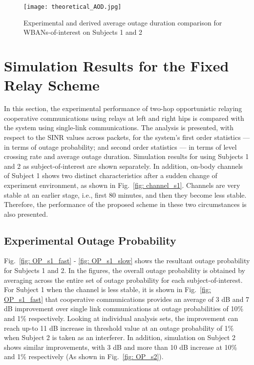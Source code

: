 \documentclass[12pt,draftcls,a4paper,onecolumn,journal]{IEEEtran}
\begin{document}
\begin{figure}[]
\centering
\texttt{[image: theoretical\_AOD.jpg]}
\caption{Experimental and derived average outage duration comparison for WBANs-of-interest on Subjects 1 and 2}
\label{fig:Theoretical AOD}
\end{figure}



\section{Simulation Results for the Fixed Relay Scheme}
In this section, the experimental performance of two-hop opportunistic relaying cooperative communications using relays at left and right hips is compared with the system using single-link communications. The analysis is presented, with respect to the SINR values across packets, for the system's first order statistics --- in terms of outage probability; and second order statistics --- in terms of level crossing rate and average outage duration. Simulation results for using Subjects 1 and 2 as subject-of-interest are shown separately. In addition, on-body channels of Subject 1 shows two distinct characteristics after a sudden change of experiment environment, as shown in Fig.~\ref{fig: channel_s1}. Channels are very stable at an earlier stage, i.e., first 80 minutes, and then they become less stable. Therefore, the performance of the proposed scheme in these two circumstances is also presented.


\subsection{Experimental Outage Probability}

Fig.~\ref{fig: OP_s1_fast} - \ref{fig: OP_s1_slow} shows the resultant outage probability for Subjects 1 and 2. In the figures, the overall outage probability is obtained by averaging across the entire set of outage probability for each subject-of-interest. For Subject 1 when the channel is less stable, it is shown in Fig.~\ref{fig: OP_s1_fast} that cooperative communications provides an average of 3 dB and 7 dB improvement over single link communications at outage probabilities of 10\% and 1\% respectively. Looking at individual analysis sets, the improvement can reach up-to 11 dB increase in threshold value at an outage probability of 1\% when Subject 2 is taken as an interferer. In addition, simulation on Subject 2 shows similar improvements, with 3 dB and more than 10 dB increase at 10\% and 1\% respectively (As shown in Fig.~\ref{fig: OP_s2}).
\end{document}
